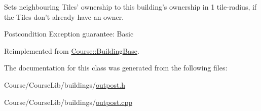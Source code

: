 Sets neighbouring Tiles' ownership to this building's ownership in 1 tile-\/radius, if the Tiles don't already have an owner. 

\begin{DoxyPostcond}{Postcondition}
Exception guarantee\-: Basic 
\end{DoxyPostcond}


Reimplemented from \hyperlink{classCourse_1_1BuildingBase_a2e3a5ad53afb74fdf030a5679e40a341}{Course\-::\-Building\-Base}.



The documentation for this class was generated from the following files\-:\begin{DoxyCompactItemize}
\item 
Course/\-Course\-Lib/buildings/\hyperlink{outpost_8h}{outpost.\-h}\item 
Course/\-Course\-Lib/buildings/\hyperlink{outpost_8cpp}{outpost.\-cpp}\end{DoxyCompactItemize}
